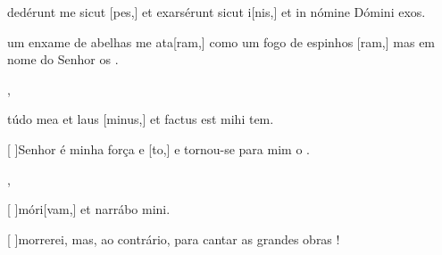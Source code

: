 {  {\item {}dedérunt me sicut [pes,] et exarsérunt sicut i[nis,] et in nómine Dómini exos.~\Antiphona}%
    {\item {} um enxame de abelhas me ata[ram,] como um fogo de espinhos [ram,] mas em nome do Senhor os .~\Antiphona},
  {\item {}túdo mea et laus [minus,] et factus est mihi tem.~\Antiphona}%
    {\item {}[ ]{Se}nhor é minha força e [to,] e tornou-se para mim o .~\Antiphona},
  {\item {}[ ]{mó}ri[vam,] et narrábo mini.~\Antiphona}%
    {\item {}[ ]{mor}rerei, mas, ao contrário,  para cantar as grandes obras !~\Antiphona}
}